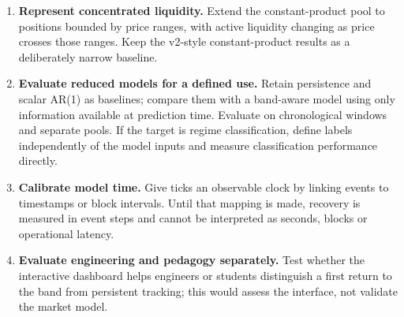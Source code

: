 \begin{enumerate}
  \item \textbf{Represent concentrated liquidity.} Extend the constant-product pool to positions bounded by price ranges, with active liquidity changing as price crosses those ranges. Keep the v2-style constant-product results as a deliberately narrow baseline.
  \item \textbf{Evaluate reduced models for a defined use.} Retain persistence and scalar AR(1) as baselines; compare them with a band-aware model using only information available at prediction time. Evaluate on chronological windows and separate pools. If the target is regime classification, define labels independently of the model inputs and measure classification performance directly.
  \item \textbf{Calibrate model time.} Give ticks an observable clock by linking events to timestamps or block intervals. Until that mapping is made, recovery is measured in event steps and cannot be interpreted as seconds, blocks or operational latency.
  \item \textbf{Evaluate engineering and pedagogy separately.} Test whether the interactive dashboard helps engineers or students distinguish a first return to the band from persistent tracking; this would assess the interface, not validate the market model.
\end{enumerate}
